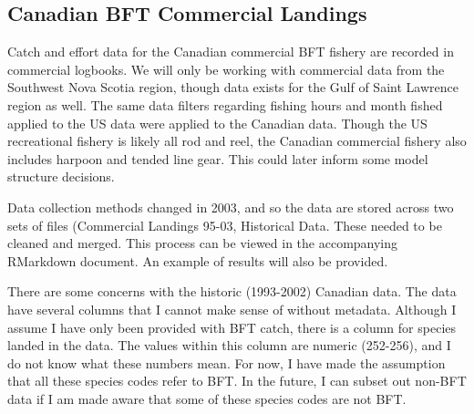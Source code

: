 \documentclass[
]{article}
\begin{document}
\hypertarget{canadian-bft-commercial-landings}{%
\subsection{Canadian BFT Commercial Landings}\label{canadian-bft-commercial-landings}}

Catch and effort data for the Canadian commercial BFT fishery are recorded in commercial logbooks. We will only be working with commercial data from the Southwest Nova Scotia region, though data exists for the Gulf of Saint Lawrence region as well. The same data filters regarding fishing hours and month fished applied to the US data were applied to the Canadian data. Though the US recreational fishery is likely all rod and reel, the Canadian commercial fishery also includes harpoon and tended line gear. This could later inform some model structure decisions.

Data collection methods changed in 2003, and so the data are stored across two sets of files (Commercial Landings 95-03, Historical Data. These needed to be cleaned and merged. This process can be viewed in the accompanying RMarkdown document. An example of results will also be provided.

There are some concerns with the historic (1993-2002) Canadian data. The data have several columns that I cannot make sense of without metadata. Although I assume I have only been provided with BFT catch, there is a column for species landed in the data. The values within this column are numeric (252-256), and I do not know what these numbers mean. For now, I have made the assumption that all these species codes refer to BFT. In the future, I can subset out non-BFT data if I am made aware that some of these species codes are not BFT.
\end{document}
